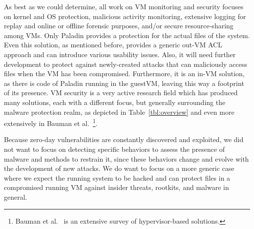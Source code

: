 \par As best as we could determine, all work on \ac{VM} monitoring and security focuses on kernel and \ac{OS} protection, malicious activity monitoring, extensive logging for replay and online or offline forensic purposes, and/or secure resource-sharing among \ac{VM}s. Only Paladin \cite{baliga2008automated} provides a protection for the actual files of the system. Even this solution, as mentioned before, provides a generic out-\ac{VM} \ac{ACL} approach and can introduce various usability issues. Also, it will need further development to protect against newly-created attacks that can maliciously access files when the \ac{VM} has been compromised. Furthermore, it is an in-\ac{VM} solution, as there is code of Paladin running in the guest\ac{VM}, leaving this way a footprint of its presence. \ac{VM} security is a very active research field which has produced many solutions, each with a different focus, but generally surrounding the malware protection realm, as depicted in Table~\ref{tbl:overview} and even more extensively in Bauman et al.~\cite{bauman2015survey}\footnote{Bauman et al.~\cite{bauman2015survey} is an extensive survey of hypervisor-based solutions.}.


\par Because zero-day vulnerabilities are constantly discovered and exploited, we did not want to focus on detecting specific behaviors to assess the presence of malware and methods to restrain it, since these behaviors change and evolve with the development of new attacks. We do want to focus on a more generic case where we expect the running system to be hacked and can protect files in a compromised running \ac{VM} against insider threats, rootkits, and malware in general. 



